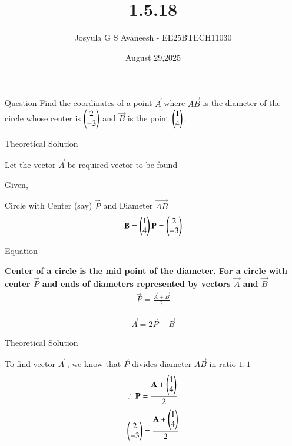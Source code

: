 \documentclass{beamer}
\title %
{1.5.18}
\date{August 29,2025}
\author 
{Josyula G S Avaneesh - EE25BTECH11030}
\begin{document}
\frame{\titlepage}
\begin{frame}{Question}
Find the coordinates of a point $\vec{A}$ where $\vec{AB}$ is the diameter of the circle whose center is $\begin{pmatrix}2\\-3 \end{pmatrix}$ and $\vec{B}$ is the point $\begin{pmatrix}1\\4\end{pmatrix}$.
\end{frame}



\begin{frame}{Theoretical Solution}

Let the vector $\vec{A}$  be required vector to be found

Given,

Circle with Center (say) $\vec{P}$ and
Diameter $\vec{AB}$ 
\begin{align}
    \mathbf{B}=\begin{pmatrix}1\\4\end{pmatrix} \mathbf{P} = \begin{pmatrix}2\\-3\end{pmatrix}
\end{align}

\end{frame}

\begin{frame}{Equation}

\textbf{Center of a circle is the mid point of the diameter. For a circle with center $\vec{P}$ and ends of diameters represented by vectors $\vec{A}$ and $\vec{B}$  }
\begin{align}
    \vec{P}=\frac{\vec{A}+\vec{B}}{2}
\end{align}

\begin{align}
    \vec{A} =2\vec{P}-\vec{B} 
\end{align}

\end{frame}

\begin{frame}{Theoretical Solution}

To find vector $\vec{A}$ , we know that $\vec{P}$ divides diameter $\vec{AB}$ in ratio $1\colon1$
\begin{align}
    \therefore \mathbf{P} = \frac{\mathbf{A} + \begin{pmatrix}1\\4\end{pmatrix}  }{2} 
\end{align}
\begin{align}
    \begin{pmatrix}2\\-3\end{pmatrix} = \frac{\mathbf{A} + \begin{pmatrix}1\\4\end{pmatrix}}{2}    
\end{align}

\end{frame}
\end{document}
